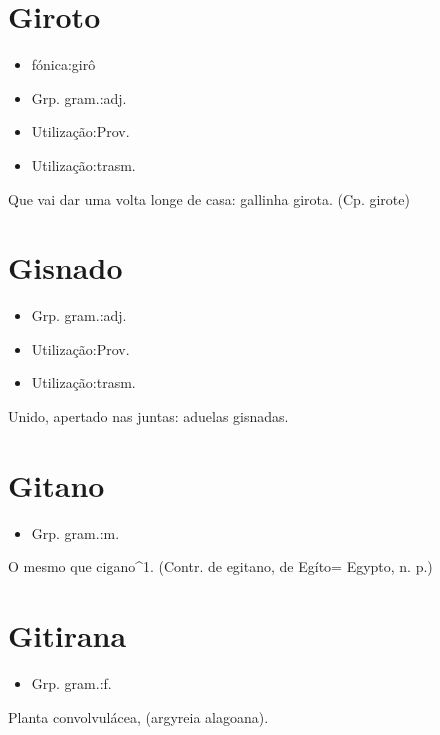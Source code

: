 \section{Giroto}
\begin{itemize}
\item {fónica:girô}
\end{itemize}
\begin{itemize}
\item {Grp. gram.:adj.}
\end{itemize}
\begin{itemize}
\item {Utilização:Prov.}
\end{itemize}
\begin{itemize}
\item {Utilização:trasm.}
\end{itemize}
Que vai dar uma volta longe de casa: \textunderscore gallinha girota\textunderscore .
(Cp. \textunderscore girote\textunderscore )
\section{Gisnado}
\begin{itemize}
\item {Grp. gram.:adj.}
\end{itemize}
\begin{itemize}
\item {Utilização:Prov.}
\end{itemize}
\begin{itemize}
\item {Utilização:trasm.}
\end{itemize}
Unido, apertado nas juntas: \textunderscore aduelas gisnadas\textunderscore .
\section{Gitano}
\begin{itemize}
\item {Grp. gram.:m.}
\end{itemize}
O mesmo que \textunderscore cigano\textunderscore ^1.
(Contr. de \textunderscore egitano\textunderscore , de \textunderscore Egíto\textunderscore  = \textunderscore Egypto\textunderscore , n. p.)
\section{Gitirana}
\begin{itemize}
\item {Grp. gram.:f.}
\end{itemize}
Planta convolvulácea, (\textunderscore argyreia alagoana\textunderscore ).
